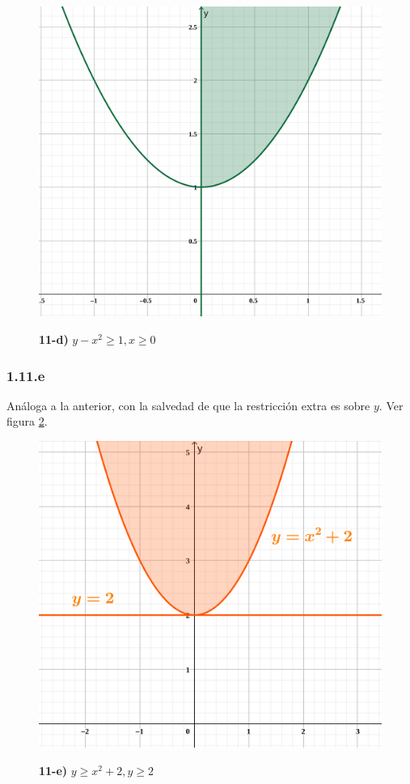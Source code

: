 \documentclass{article}
\begin{document}
\begin{figure}[ht]
\caption{\textbf{11-d)} $y - x^2 \geq 1, x \geq 0$}
\includegraphics[scale=1.75]{img/ejercicios/1/11-d.png} 
\centering
\label{fig:1-11-d}
\end{figure}

\subsubsection*{1.11.e}
\label{subsubsec:1.11.e}

Análoga a la anterior, con la salvedad de que la restricción extra es sobre $y$. Ver figura \ref{fig:1-11-e}.

\begin{figure}[ht]
\caption{\textbf{11-e)} $y \geq x^2 + 2, y \geq 2$}
\includegraphics[scale=1.0]{img/ejercicios/1/11-e.png} 
\centering
\label{fig:1-11-e}
\end{figure}
\end{document}
